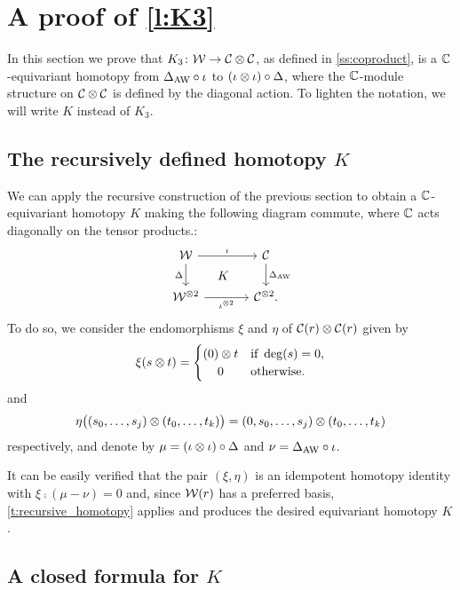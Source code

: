 
\section{A proof of \cref{l:K3}}\label{s:postponed}

\noindent In this section we prove that $K_3 \colon \mathcal{W} \to \mathcal{C} \otimes \mathcal{C}$, as defined in \cref{ss:coproduct}, is a $\mathbb{C}$-equivariant homotopy from $\Delta_{\operatorname{AW}} \mathbin{\circ} \iota$ to $(\iota \otimes \iota) \mathbin{\circ} \Delta$, where the $\mathbb{C}$-module structure on $\mathcal{C} \otimes \mathcal{C}$ is defined by the diagonal action. To lighten the notation, we will write $K$ instead of $K_3$.

\subsection{The recursively defined homotopy $K$}

We can apply the recursive construction of the previous section to obtain a $\mathbb{C}$-equivariant homotopy $K$ making the following diagram commute, where $\mathbb{C}$ acts diagonally on the tensor products.:
\[
\begin{tikzcd}[column sep=large]
	\cW \arrow[r,"\iota"] \arrow[d,"\Delta"'] \arrow[dr,phantom,"K"]&
	\cC \arrow[d,"\Delta_{\AW}"] \\
	\cW^{\ot 2} \arrow[r,"\iota^{\ot 2}"'] &
	\cC^{\ot 2}.
\end{tikzcd}
\]
To do so, we consider the endomorphisms $\xi$ and $\eta$ of $\mathcal{C}(r) \otimes \mathcal{C}(r)$ given by
\[
\xi(s \ot t) =
\begin{cases}
	(0) \ot t & \text{if } \deg(s) = 0, \\
	\hfil0 & \text{otherwise}.
\end{cases}
\]
and
\[
\eta \big((s_0,\dots,s_j) \otimes (t_0,\dots,t_k)\big) = (0,s_0,\dots,s_j) \otimes (t_0,\dots,t_k)
\]
respectively, and denote by $\mu = (\iota \otimes \iota) \mathbin{\circ} \Delta$ and $\nu = \Delta_{\operatorname{AW}} \mathbin{\circ} \iota$.

It can be easily verified that the pair $(\xi,\eta)$ is an idempotent homotopy identity with $\xi \comp (\mu - \nu) = 0$ and, since $\mathcal{W}(r)$ has a preferred basis, \cref{t:recursive_homotopy} applies and produces the desired equivariant homotopy $K$.

\subsection{A closed formula for $K$}\label{ss:closed formula for K}

